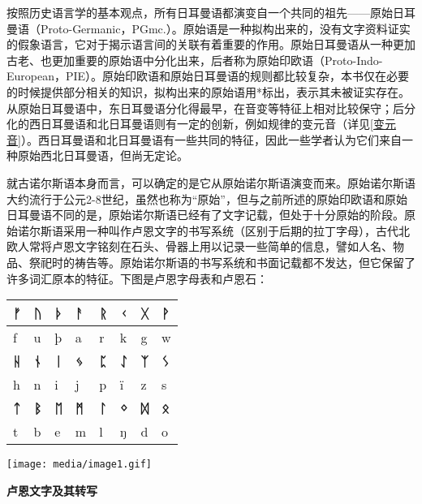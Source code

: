 按照历史语言学的基本观点，所有日耳曼语都演变自一个共同的祖先------原始日耳曼语（Proto-Germanic，PGmc.）。原始语是一种拟构出来的，没有文字资料证实的假象语言，它对于揭示语言间的关联有着重要的作用。原始日耳曼语从一种更加古老、也更加重要的原始语中分化出来，后者称为原始印欧语（Proto-Indo-European，PIE）。原始印欧语和原始日耳曼语的规则都比较复杂，本书仅在必要的时候提供部分相关的知识，拟构出来的原始语用*标出，表示其未被证实存在。从原始日耳曼语中，东日耳曼语分化得最早，在音变等特征上相对比较保守；后分化的西日耳曼语和北日耳曼语则有一定的创新，例如规律的变元音（详见\ref{变元音}）。西日耳曼语和北日耳曼语有一些共同的特征，因此一些学者认为它们来自一种原始西北日耳曼语，但尚无定论。

就古诺尔斯语本身而言，可以确定的是它从原始诺尔斯语演变而来。原始诺尔斯语大约流行于公元2-8世纪，虽然也称为``原始''，但与之前所述的原始印欧语和原始日耳曼语不同的是，原始诺尔斯语已经有了文字记载，但处于十分原始的阶段。原始诺尔斯语采用一种叫作卢恩文字的书写系统（区别于后期的拉丁字母），古代北欧人常将卢恩文字铭刻在石头、骨器上用以记录一些简单的信息，譬如人名、物品、祭祀时的祷告等。原始诺尔斯语的书写系统和书面记载都不发达，但它保留了许多词汇原本的特征。下图是卢恩字母表和卢恩石：

\begin{longtable}{llllllll}
  \toprule
  \textbf{ᚠ} & \textbf{ᚢ} & \textbf{ᚦ} & \textbf{ᚨ} & \textbf{ᚱ} & \textbf{ᚲ} & \textbf{ᚷ} & \textbf{ᚹ} \\
  \midrule
  \endhead
  \bottomrule
  \endfoot
  f          & u          & þ          & a          & r          & k          & g          & w          \\
  \textbf{ᚺ} & \textbf{ᚾ} & \textbf{ᛁ} & \textbf{ᛃ} & \textbf{ᛈ} &
  \textbf{ᛇ} & \textbf{ᛉ} & \textbf{ᛊ}                                                                  \\
  h          & n          & i          & j          & p          & ï          & z          & s          \\
  \textbf{ᛏ} & \textbf{ᛒ} & \textbf{ᛖ} & \textbf{ᛗ} & \textbf{ᛚ} &
  \textbf{ᛜ} & \textbf{ᛞ} & \textbf{ᛟ}                                                                  \\
  t          & b          & e          & m          & l          & ŋ          & d          & o          \\
\end{longtable}

\texttt{[image: media/image1.gif]}

\textbf{卢恩文字及其转写}

